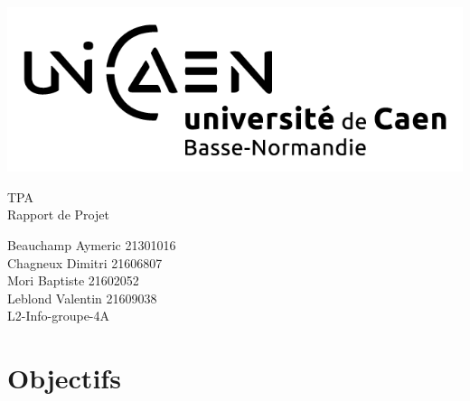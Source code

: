\documentclass[a4paper,12pt]{article} %
\begin{document}


\begin{titlepage}

\includegraphics[scale=0.3]{images/unicaen.png}

\vspace{7cm}

\begin{center}

\begin{Huge}
TPA\\
Rapport de Projet\\
\end{Huge}
\vspace{2cm}
\begin{large}
Beauchamp Aymeric 21301016\\
Chagneux Dimitri 21606807\\
Mori Baptiste 21602052\\
Leblond Valentin 21609038\\
\vspace{1cm}
L2-Info-groupe-4A
\end{large}

\end{center}
\end{titlepage}



\newpage

\tableofcontents

\newpage



\section*{Objectifs}
\end{document}
